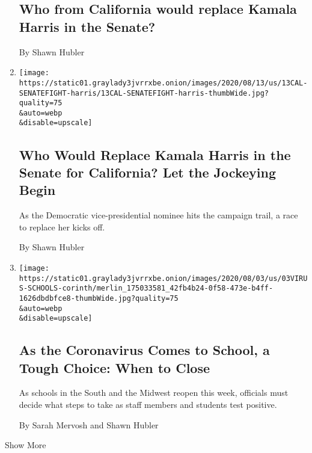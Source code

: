 \begin{enumerate}
{  \subsection{Who from California would replace Kamala Harris in the
  Senate?}\label{who-from-california-would-replace-kamala-harris-in-the-senate}}

  By Shawn Hubler
\item
  \href{/2020/08/13/us/california-senate-kamala-harris.html}{}

  \texttt{[image: https://static01.graylady3jvrrxbe.onion/images/2020/08/13/us/13CAL-SENATEFIGHT-harris/13CAL-SENATEFIGHT-harris-thumbWide.jpg?quality=75\\\&auto=webp\\\&disable=upscale]}

  \hypertarget{who-would-replace-kamala-harris-in-the-senate-for-california-let-the-jockeying-begin}{%
  \subsection{Who Would Replace Kamala Harris in the Senate for
  California? Let the Jockeying
  Begin}\label{who-would-replace-kamala-harris-in-the-senate-for-california-let-the-jockeying-begin}}

  As the Democratic vice-presidential nominee hits the campaign trail, a
  race to replace her kicks off.

  By Shawn Hubler
\item
  \href{/2020/08/03/us/school-closing-coronavirus.html}{}

  \texttt{[image: https://static01.graylady3jvrrxbe.onion/images/2020/08/03/us/03VIRUS-SCHOOLS-corinth/merlin\_175033581\_42fb4b24-0f58-473e-b4ff-1626dbdbfce8-thumbWide.jpg?quality=75\\\&auto=webp\\\&disable=upscale]}

  \hypertarget{as-the-coronavirus-comes-to-school-a-tough-choice-when-to-close}{%
  \subsection{As the Coronavirus Comes to School, a Tough Choice: When
  to
  Close}\label{as-the-coronavirus-comes-to-school-a-tough-choice-when-to-close}}

  As schools in the South and the Midwest reopen this week, officials
  must decide what steps to take as staff members and students test
  positive.

  By Sarah Mervosh and Shawn Hubler
\end{enumerate}

Show More

